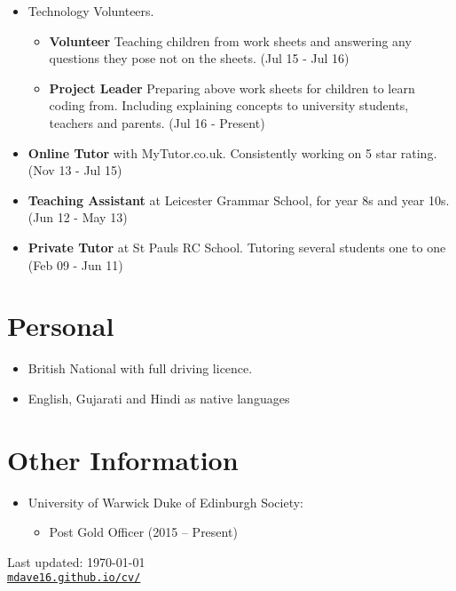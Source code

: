 \documentclass[letterpaper]{article}
\def\footerlink{mdave16.github.io/cv/}
\begin{document}
	\begin{itemize}
		\item Technology Volunteers. 
		\begin{itemize}
			\item \textbf{Volunteer} Teaching children from work sheets and answering any questions they pose not on the sheets. (Jul 15 - Jul 16)
			\item \textbf{Project Leader} Preparing above work sheets for children to learn coding from. Including explaining concepts to university students, teachers and parents. (Jul 16 - Present)
		\end{itemize}
	
		\item \textbf{Online Tutor} with MyTutor.co.uk. Consistently working on 5 star rating. (Nov 13 - Jul 15)
		
		\item \textbf{Teaching Assistant} at Leicester Grammar School, for year 8s and year 10s. (Jun 12 - May 13)
		
		\item \textbf{Private Tutor} at St Pauls RC School. Tutoring several students one to one (Feb 09 - Jun 11)
	\end{itemize}
	
	\section*{Personal}
	\begin{itemize}
		\item British National with full driving licence.
		\item English, Gujarati and Hindi as native languages
		
	\end{itemize}
	\section*{Other Information}
	\begin{itemize}
		\item University of Warwick Duke of Edinburgh Society:
		\begin{itemize}
			\item Post Gold Officer (2015 -- Present)
		\end{itemize}
		 
	\end{itemize}
	\bigskip
	\begin{center}
		\begin{footnotesize}
			Last updated: \today \\
			\href{\footerlink}{\texttt{\footerlink}}
		\end{footnotesize}
	\end{center}
\end{document}
